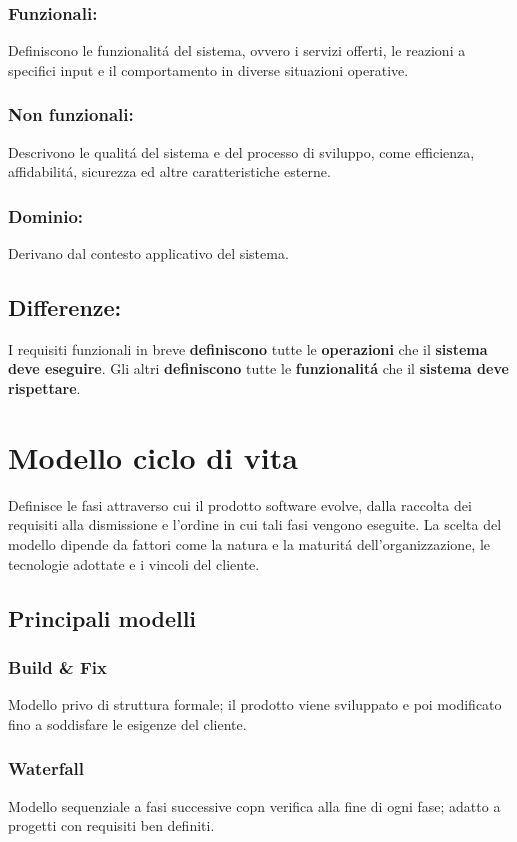 \documentclass[11pt]{article}
\begin{document}
\subsubsection{Funzionali:}
\label{sec:orga35a23b}
Definiscono le funzionalitá del sistema, ovvero i servizi offerti, le reazioni a specifici input e il comportamento in diverse situazioni operative.
\subsubsection{Non funzionali:}
\label{sec:orgd47e300}
Descrivono le qualitá del sistema e del processo di sviluppo, come efficienza, affidabilitá, sicurezza ed altre caratteristiche esterne.
\subsubsection{Dominio:}
\label{sec:orgbc792d8}
Derivano dal contesto applicativo del sistema.
\subsection{Differenze:}
\label{sec:orgf88163b}
I requisiti funzionali in breve \textbf{\textbf{definiscono}} tutte le \textbf{\textbf{operazioni}} che il \textbf{\textbf{sistema deve eseguire}}.
Gli altri \textbf{\textbf{definiscono}} tutte le \textbf{\textbf{funzionalitá}} che il \textbf{\textbf{sistema deve rispettare}}.
\section{Modello ciclo di vita}
\label{sec:org5bebf62}
Definisce le fasi attraverso cui il prodotto software evolve, dalla raccolta dei requisiti alla dismissione e l'ordine in cui tali fasi vengono eseguite.
La scelta del modello dipende da fattori come la natura e la maturitá dell'organizzazione, le tecnologie adottate e i vincoli del cliente.
\subsection{Principali modelli}
\label{sec:org10c385c}
\subsubsection{Build \& Fix}
\label{sec:org2ad5ab6}
Modello privo di struttura formale; il prodotto viene sviluppato e poi modificato fino a soddisfare le esigenze del cliente.
\subsubsection{Waterfall}
\label{sec:orgf791a1f}
Modello sequenziale a fasi successive copn verifica alla fine di ogni fase; adatto a progetti con requisiti ben definiti.
\end{document}
